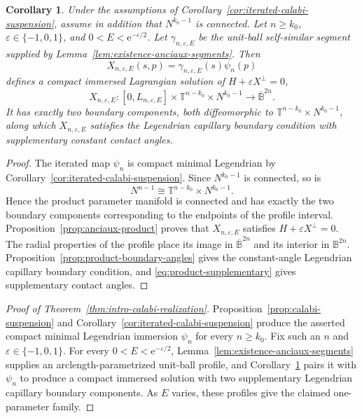 \documentclass[11pt,a4paper]{article}
\numberwithin{equation}{section}
\newtheorem{corollary}[theorem]{Corollary}
\newcommand{\B}{\mathbb B}
\newcommand{\ee}{\mathrm e}
\begin{document}
\begin{corollary}\label{cor:general-link-realization}
Under the assumptions of Corollary~\ref{cor:iterated-calabi-suspension}, assume in addition that $N^{k_0-1}$ is connected.  Let $n\ge k_0$, $\varepsilon\in\{-1,0,1\}$, and $0<E<\ee^{-\varepsilon/2}$.  Let $\gamma_{n,\varepsilon,E}$ be the unit-ball self-similar segment supplied by Lemma~\ref{lem:existence-anciaux-segments}.  Then
$$
        X_{n,\varepsilon,E}(s,p)=\gamma_{n,\varepsilon,E}(s)\psi_n(p)
$$
defines a compact immersed Lagrangian solution of
$H+\varepsilon X^\perp=0$,
$$
        X_{n,\varepsilon,E}:
        [0,L_{n,\varepsilon,E}]\times\mathbb T^{n-k_0}\times N^{k_0-1}
        \longrightarrow\overline{\B}^{2n}.
$$
It has exactly two boundary components, both diffeomorphic to $\mathbb T^{n-k_0}\times N^{k_0-1}$, along which  $X_{n,\varepsilon,E}$ satisfies the Legendrian capillary boundary condition with supplementary constant contact angles.
\end{corollary}

\begin{proof}
The iterated map $\psi_n$ is compact minimal Legendrian by Corollary~\ref{cor:iterated-calabi-suspension}.  Since $N^{k_0-1}$ is connected, so is
$$
        N^{n-1}\cong\mathbb T^{n-k_0}\times N^{k_0-1}.
$$
Hence the product parameter manifold is connected and has exactly the two boundary components corresponding to the endpoints of the profile interval.  Proposition~\ref{prop:anciaux-product} proves that $X_{n,\varepsilon,E}$ satisfies $H+\varepsilon X^\perp=0$.  The radial properties of the profile place its image in $\overline{\B}^{2n}$ and its interior in $\B^{2n}$.  Proposition~\ref{prop:product-boundary-angles} gives the constant-angle Legendrian capillary boundary condition, and \eqref{eq:product-supplementary} gives supplementary contact angles.
\end{proof}

\begin{proof}[Proof of Theorem~\ref{thm:intro-calabi-realization}]
Proposition~\ref{prop:calabi-suspension} and
Corollary~\ref{cor:iterated-calabi-suspension} produce the asserted compact
minimal Legendrian immersion $\psi_n$ for every $n\ge k_0$.  Fix such an $n$
and $\varepsilon\in\{-1,0,1\}$.  For every
$0<E<\ee^{-\varepsilon/2}$,
Lemma~\ref{lem:existence-anciaux-segments} supplies an
arclength-parametrized unit-ball profile, and
Corollary~\ref{cor:general-link-realization} pairs it with $\psi_n$ to produce
a compact immersed solution with two supplementary Legendrian capillary
boundary components.  As $E$ varies, these profiles give the claimed
one-parameter family.
\end{proof}
\end{document}
